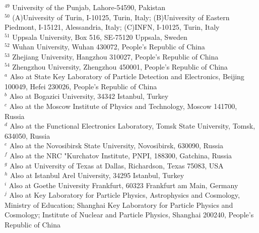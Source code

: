 \documentclass[aps,prd,twocolumn,showpacs,floatfix,byrevtex]{revtex4-1}
\begin{document}
{{$^{49}$ University of the Punjab, Lahore-54590, Pakistan\\
$^{50}$ (A)University of Turin, I-10125, Turin, Italy; (B)University of Eastern Piedmont, I-15121, Alessandria, Italy; (C)INFN, I-10125, Turin, Italy\\
$^{51}$ Uppsala University, Box 516, SE-75120 Uppsala, Sweden\\
$^{52}$ Wuhan University, Wuhan 430072, People's Republic of China\\
$^{53}$ Zhejiang University, Hangzhou 310027, People's Republic of China\\
$^{54}$ Zhengzhou University, Zhengzhou 450001, People's Republic of China\\
\vspace{0.2cm}
$^{a}$ Also at State Key Laboratory of Particle Detection and Electronics, Beijing 100049, Hefei 230026, People's Republic of China\\
$^{b}$ Also at Bogazici University, 34342 Istanbul, Turkey\\
$^{c}$ Also at the Moscow Institute of Physics and Technology, Moscow 141700, Russia\\
$^{d}$ Also at the Functional Electronics Laboratory, Tomsk State University, Tomsk, 634050, Russia\\
$^{e}$ Also at the Novosibirsk State University, Novosibirsk, 630090, Russia\\
$^{f}$ Also at the NRC "Kurchatov Institute, PNPI, 188300, Gatchina, Russia\\
$^{g}$ Also at University of Texas at Dallas, Richardson, Texas 75083, USA\\
$^{h}$ Also at Istanbul Arel University, 34295 Istanbul, Turkey\\
$^{i}$ Also at Goethe University Frankfurt, 60323 Frankfurt am Main, Germany\\
$^{j}$ Also at Key Laboratory for Particle Physics, Astrophysics and Cosmology, Ministry of Education; Shanghai Key Laboratory for Particle Physics and Cosmology; Institute of Nuclear and Particle Physics, Shanghai 200240, People's Republic of China\\
}
\vspace{0.4cm}
}

\end{document}
